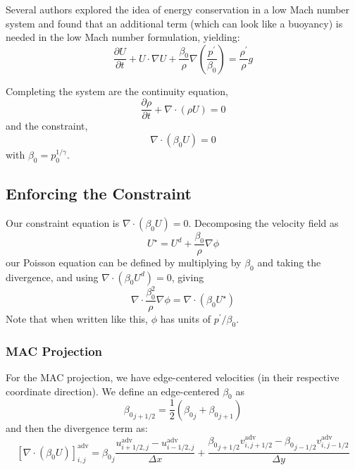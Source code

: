 Several authors \cite{KP:2012,VLBWZ:2013} explored the idea of energy
conservation in a low Mach number system and found that an additional term (which can
look like a buoyancy) is needed in the low Mach number formulation, yielding:
\begin{equation}
\frac{\partial U}{\partial t} + U \cdot \nabla U + 
   \frac{\beta_0}{\rho} \nabla \left (\frac{p^\prime}{\beta_0} \right ) = 
   \frac{\rho^\prime}{\rho} g
\end{equation}

Completing the system are the continuity equation,
\begin{equation}
\frac{\partial \rho}{\partial t} + \nabla \cdot (\rho U) = 0
\end{equation}
and the constraint,
\begin{equation}
\nabla \cdot (\beta_0 U) = 0
\end{equation}
with $\beta_0 = p_0^{1/\gamma}$.

\subsection{Enforcing the Constraint}

Our constraint equation is $\nabla \cdot (\beta_0 U) = 0$.
Decomposing the velocity field as
\begin{equation}
U^\star = U^d + \frac{\beta_0}{\rho} \nabla \phi
\end{equation}
our Poisson equation can be defined by multiplying by $\beta_0$ and
taking the divergence, and using $\nabla \cdot (\beta_0 U^d) = 0$, giving
\begin{equation}
\nabla \cdot \frac{\beta_0^2}{\rho} \nabla \phi = \nabla \cdot (\beta_0 U^\star)
\end{equation}
Note that when written like this, $\phi$ has units of $p^\prime/\beta_0$.

\subsubsection{MAC Projection}

For the MAC projection, we have edge-centered velocities (in their
respective coordinate direction).  We define an edge-centered $\beta_0$ as
\begin{equation}
{\beta_0}_{j+1/2} = \frac{1}{2} ( {\beta_0}_j + {\beta_0}_{j+1} )
\end{equation}
and then the divergence term as:
\begin{equation}
\left [ \nabla \cdot (\beta_0 U) \right ]_{i,j}^\mathrm{adv} =
   {\beta_0}_j \frac{u^\mathrm{adv}_{i+1/2,j} - 
                     u^\mathrm{adv}_{i-1/2,j}}{\Delta x} +
   \frac{{\beta_0}_{j+1/2} v^\mathrm{adv}_{i,j+1/2} - 
         {\beta_0}_{j-1/2} v^\mathrm{adv}_{i,j-1/2} }{\Delta y}
\end{equation}

